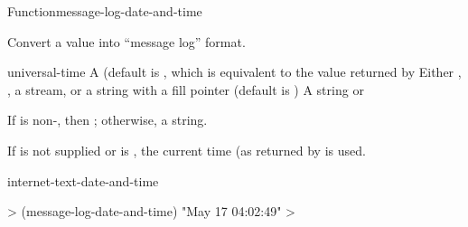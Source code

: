 \documentclass[10pt,twoside,english,pdftex]{article}
\begin{document}
\begin{functiondoc}{Function}{message-log-date-and-time}{%
    }
% 

\fnsyntax

\fnpurpose Convert a  value into ``message log''
 format.

\fnpackage {}

\fnmodule {}

\fnargs
\begin{args}{universal-time}
 A  (default is \nil,
  which is equivalent to the value returned by
\arg[destination] Either \nil, , a stream, or a string with a fill 
pointer (default is \nil)
\arg[result] A string or \nil{}
\end{args}

\fnreturns If  is non-\nil, then \nil; otherwise, a string.

\fndescription
{}%
%
If  is not supplied or is \nil, the current time
(as returned by  is used.

\begin{alsos}{internet-text-date-and-time}
\end{alsos}

\fnexample
%
\W\supp
\begin{example}
  > (message-log-date-and-time)
  "May 17 04:02:49"
  >
\end{example}

\end{functiondoc}

\end{document}
